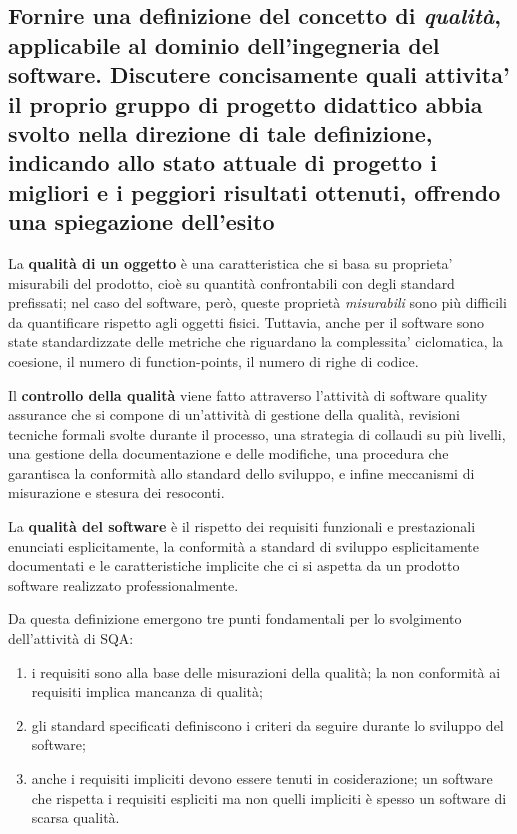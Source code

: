 \subsection{Fornire una definizione del concetto di \textit{qualità}, applicabile al dominio dell'ingegneria del software. Discutere concisamente quali attivita' il proprio gruppo di progetto didattico abbia svolto nella direzione di tale definizione, indicando allo stato attuale di progetto  i migliori e i peggiori risultati ottenuti, offrendo una spiegazione dell'esito}

La \textbf{qualità di un oggetto} è una caratteristica che si basa su proprieta' misurabili del prodotto, cioè su quantità confrontabili con degli standard prefissati; nel caso del software, però, queste proprietà \textit{misurabili} sono più difficili da quantificare rispetto agli oggetti fisici. Tuttavia, anche per il software sono state standardizzate delle metriche che riguardano la complessita' ciclomatica, la coesione, il numero di function-points, il numero di righe di codice.

Il \textbf{controllo della qualità} viene fatto attraverso l'attività di software quality assurance che si compone di un’attività di gestione della qualità, revisioni tecniche formali svolte durante il processo, una strategia di collaudi su più livelli, una gestione della documentazione e delle modifiche, una procedura che garantisca la conformità allo standard dello sviluppo, e infine meccanismi di misurazione e stesura dei resoconti.

La \textbf{qualità del software} è il rispetto dei requisiti funzionali e prestazionali enunciati esplicitamente, la conformità a standard di sviluppo esplicitamente documentati e le caratteristiche implicite che ci si aspetta da un prodotto software realizzato professionalmente.

Da questa definizione emergono tre punti fondamentali per lo svolgimento dell'attività di SQA:
\begin{enumerate}
 \item i requisiti sono alla base delle misurazioni della qualità; la non conformità ai requisiti implica mancanza di qualità;
\item gli standard specificati definiscono i criteri da seguire durante lo sviluppo del software;
\item anche i requisiti impliciti devono essere tenuti in cosiderazione; un software che rispetta i requisiti
espliciti ma non quelli impliciti è spesso un software di scarsa qualità.
\end{enumerate}

